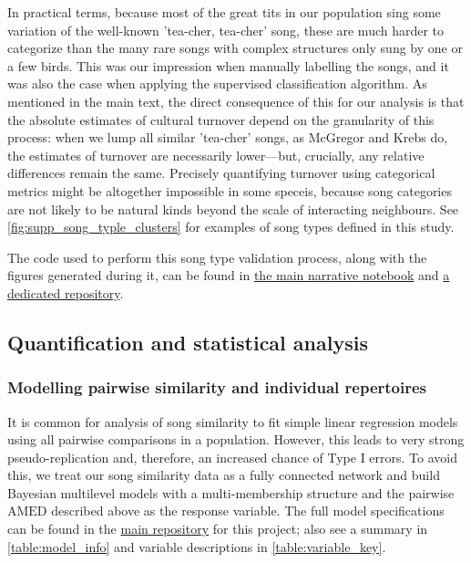 In practical terms, because most of the great tits in our population sing some variation of the well-known 'tea-cher, tea-cher' song, these are much harder to categorize than the many rare songs with complex structures only sung by one or a few birds. This was our impression when manually labelling the songs, and it was also the case when applying the supervised classification algorithm. As mentioned in the main text, the direct consequence of this for our analysis is that the absolute estimates of cultural turnover depend on the granularity of this process: when we lump all similar 'tea-cher' songs, as McGregor and Krebs \textcite{mcgregor1982b} do, the estimates of turnover are necessarily lower---but, crucially, any relative differences remain the same. Precisely quantifying turnover using categorical metrics might be altogether impossible in some speceis, because song categories are not likely to be natural kinds beyond the scale of interacting neighbours. See \autoref{fig:supp_song_typle_clusters} for examples of song types defined in this study.

The code used to perform this song type validation process, along with the figures generated during it, can be found in \href{https://github.com/nilomr/wytham-songtype-validation/blob/main/notebooks/4_train-model.ipynb}{the main narrative notebook} and \href{https://github.com/nilomr/wytham-songtype-validation}{a dedicated repository}.

\subsection{Quantification and statistical analysis}

\subsubsection{Modelling pairwise similarity and individual repertoires}

It is common for analysis of song similarity to fit simple linear regression models using all pairwise comparisons in a population. However, this leads to very strong pseudo-replication and, therefore, an increased chance of Type I errors. To avoid this, we treat our song similarity data as a fully connected network and build Bayesian multilevel models with a multi-membership structure and the pairwise $\text{AMED}$ described above as the response variable. The full model specifications can be found in the \href{https://github.com/nilomr/birdsong-demography}{main repository} for this project; also see a summary in \autoref{table:model_info} and variable descriptions in \autoref{table:variable_key}.

